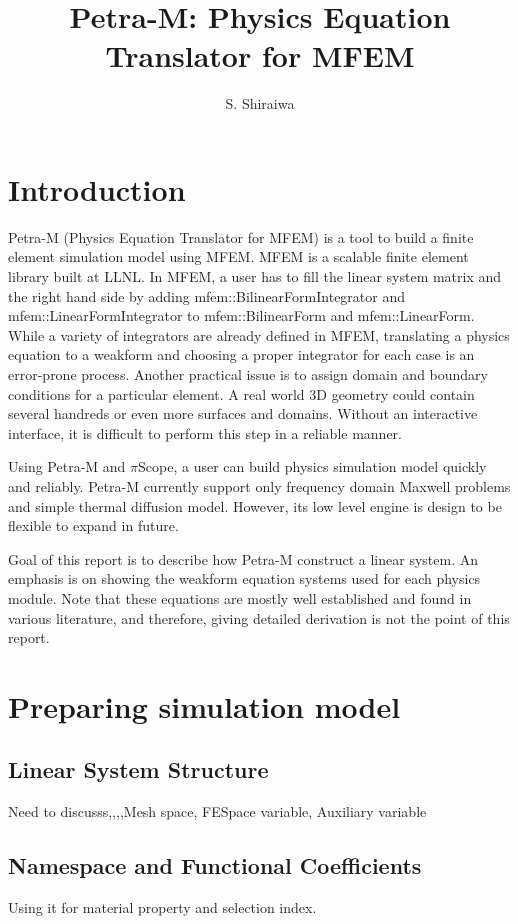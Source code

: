\documentclass[11pt,a4paper,draft]{report}
\author{S. Shiraiwa}
\title{Petra-M: Physics Equation Translator for MFEM}
\begin{document}
\lstset{language=Python}
\maketitle
\tableofcontents
\newpage

\chapter{Introduction}
Petra-M (Physics Equation Translator for MFEM) is a tool to build a finite element simulation model using MFEM. 
MFEM is a scalable finite element library built at LLNL. In MFEM,  a user has to fill the linear system matrix and the right hand side by adding  mfem::BilinearFormIntegrator and mfem::LinearFormIntegrator to mfem::BilinearForm and mfem::LinearForm.
While a variety of integrators are already defined in MFEM, translating a physics equation to a weakform and choosing a proper integrator for each case is an error-prone process. 
Another practical issue is to assign domain and boundary conditions for a particular element. A real world 3D geometry could contain several handreds or even more surfaces and domains. Without an interactive interface, it is difficult to perform this step in a reliable manner.

Using Petra-M and $\pi$Scope, a user can build physics simulation model quickly and reliably. Petra-M currently support only frequency domain Maxwell problems and simple thermal diffusion model. However, its low level engine is design to be flexible to expand in future.

Goal of this report is to describe how Petra-M construct a linear system. An emphasis is on showing the weakform equation systems used for each physics module. Note that these equations are mostly well established and found in various literature, and therefore, giving detailed derivation is not the point of this report. 


\chapter{Preparing simulation model}
\section{Linear System Structure}
Need to discusss,,,,Mesh space, FESpace variable, Auxiliary variable

\section{Namespace and Functional Coefficients}
Using it for material property and selection index.
\end{document}
